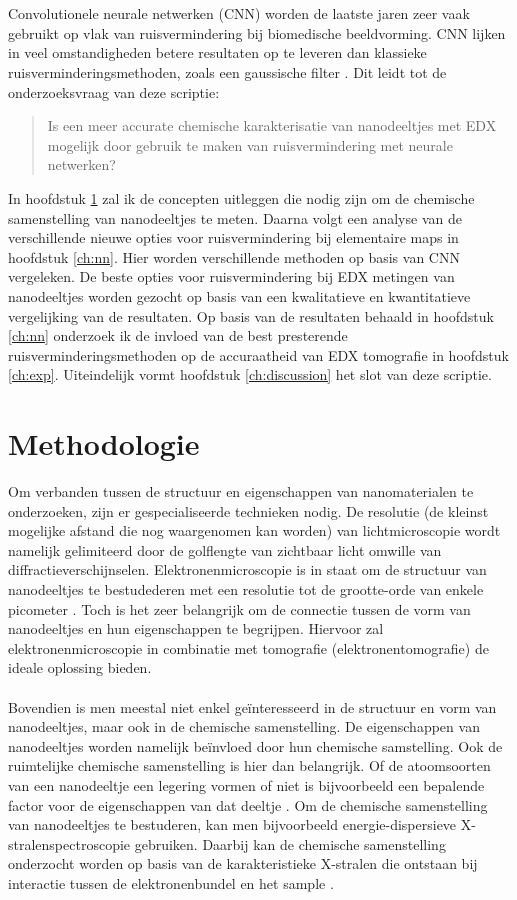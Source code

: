 \documentclass{report}
\begin{document}
\\ \\
Convolutionele neurale netwerken (CNN) worden de laatste jaren zeer vaak gebruikt op vlak van ruisvermindering bij biomedische beeldvorming. CNN lijken in veel omstandigheden betere resultaten op te leveren dan klassieke ruisverminderingsmethoden, zoals een gaussische filter \cite{paper:unet, paper:msdnet}. Dit leidt tot de onderzoeksvraag van deze scriptie:
\begin{quote}
Is een meer accurate chemische karakterisatie van nanodeeltjes met EDX mogelijk door gebruik te maken van ruisvermindering met neurale netwerken?
\end{quote}
In hoofdstuk \ref{ch:review} zal ik de concepten uitleggen die nodig zijn om de chemische samenstelling van nanodeeltjes te meten. Daarna volgt een analyse van de verschillende nieuwe opties voor ruisvermindering bij elementaire maps in hoofdstuk \ref{ch:nn}. Hier worden verschillende methoden op basis van CNN vergeleken. De beste opties voor ruisvermindering bij EDX metingen van nanodeeltjes worden gezocht op basis van een kwalitatieve en kwantitatieve vergelijking van de resultaten. Op basis van de resultaten behaald in hoofdstuk \ref{ch:nn} onderzoek ik de invloed van de best presterende ruisverminderingsmethoden op de accuraatheid van EDX tomografie in hoofdstuk \ref{ch:exp}. Uiteindelijk vormt hoofdstuk \ref{ch:discussion} het slot van deze scriptie.


\chapter{Methodologie} \label{ch:review}
Om verbanden tussen de structuur en eigenschappen van nanomaterialen te onderzoeken, zijn er gespecialiseerde technieken nodig. De resolutie (de kleinst mogelijke afstand die nog waargenomen kan worden) van lichtmicroscopie wordt namelijk gelimiteerd door de golflengte van zichtbaar licht omwille van diffractieverschijnselen. Elektronenmicroscopie is in staat om de structuur van nanodeeltjes te bestudederen met een resolutie tot de grootte-orde van enkele picometer \cite{book:williamscarter}. Toch is het zeer belangrijk om de connectie tussen de vorm van nanodeeltjes en hun eigenschappen te begrijpen. Hiervoor zal elektronenmicroscopie in combinatie met tomografie (elektronentomografie) de ideale oplossing bieden.
\\ \\
Bovendien is men meestal niet enkel geïnteresseerd in de structuur en vorm van nanodeeltjes, maar ook in de chemische samenstelling. De eigenschappen van nanodeeltjes worden namelijk beïnvloed door hun chemische samstelling. Ook de ruimtelijke chemische samenstelling is hier dan belangrijk. Of de atoomsoorten van een nanodeeltje een legering vormen of niet is bijvoorbeeld een bepalende factor voor de eigenschappen van dat deeltje \cite{paper:alloys}. Om de chemische samenstelling van nanodeeltjes te bestuderen, kan men bijvoorbeeld energie-dispersieve X-stralenspectroscopie gebruiken. Daarbij kan de chemische samenstelling onderzocht worden op basis van de karakteristieke X-stralen die ontstaan bij interactie tussen de elektronenbundel en het sample \cite{book:williamscarter}.
\end{document}
